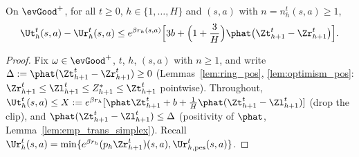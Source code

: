 \begin{lemma}\label{lem:certificate_pos}
\leanok
{}
On $\evGood^+$, for all $t \ge 0$, $h \in \{1, \dots, H\}$ and $(s,a)$ with $n = n_h^t(s,a) \ge 1$,
\[
  \Ut_h^t(s,a) - \Ur_h^t(s,a)
  \le e^{\beta r_h(s,a)}\Big[3 b + \Big(1 + \frac3H\Big)\phat\big(\Zt^t_{h+1} - \Zr^t_{h+1}\big)\Big] .
\]
\end{lemma}

\begin{proof}
\leanok
Fix $\omega \in \evGood^+$, $t$, $h$, $(s,a)$ with $n \ge 1$, and write $\Delta := \phat(\Zt^t_{h+1} - \Zr^t_{h+1}) \ge 0$
(Lemmas~\ref{lem:ring_pos}, \ref{lem:optimism_pos}: $\Zr^t_{h+1} \le \Zl^t_{h+1} \le Z^*_{h+1} \le \Zt^t_{h+1}$
pointwise). Throughout, $\Ut_h^t(s,a) \le X := e^{\beta r_h}[\phat\Zt^t_{h+1} + b + \frac1H\phat(\Zt^t_{h+1} - \Zl^t_{h+1})]$
(drop the clip), and $\phat(\Zt^t_{h+1} - \Zl^t_{h+1}) \le \Delta$ (positivity of $\phat$,
Lemma~\ref{lem:emp_trans_simplex}). Recall $\Ur_h^t(s,a) = \min\{e^{\beta r_h}(p_h\Zr^t_{h+1})(s,a), \Ur^t_{h,\mathrm{pes}}(s,a)\}$.


\end{proof}

